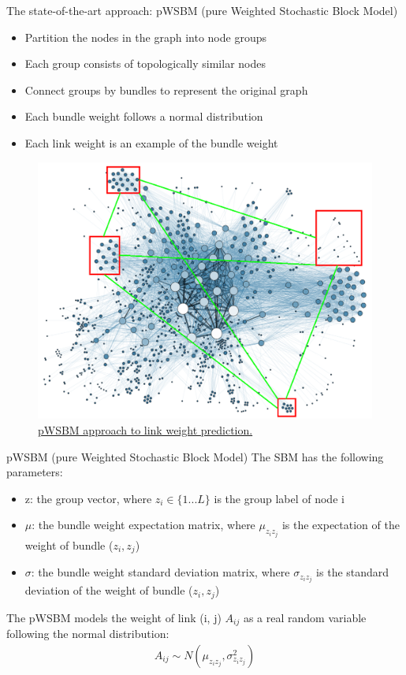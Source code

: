 \documentclass{beamer}
\begin{document}
\begin{frame}{The state-of-the-art approach: pWSBM (pure Weighted Stochastic Block Model)}
	\begin{itemize}
		\item Partition the nodes in the graph into node groups
		\item Each group consists of topologically similar nodes
		\item Connect groups by bundles to represent the original graph
		\item Each bundle weight follows a normal distribution
		\item Each link weight is an example of the bundle weight
	\end{itemize}
	\begin{figure}[H]
		\centering
		\includegraphics[width=0.4\linewidth]{SBM}
		\caption{ \href{https://commons.wikimedia.org/wiki/File:Social_Network_Analysis_Visualization.png}{pWSBM approach to link weight prediction.}}
		\label{fig:SBM}
	\end{figure}
\end{frame}

\begin{frame}{pWSBM (pure Weighted Stochastic Block Model)}
	The SBM has the following parameters:
	\begin{itemize}
		\item z: the group vector,
		where $ z_i \in \{ 1 ... L \} $ is the group label of node i
		\item $ \mu $: the bundle weight expectation matrix,
		where $ \mu_{z_i z_j} $ is the expectation of the weight of bundle ($z_i, z_j$)
		\item $ \sigma $: the bundle weight standard deviation matrix,
		where $ \sigma_{z_i z_j} $ is the standard deviation of the weight of bundle ($z_i, z_j$)
	\end{itemize}
	The pWSBM models the weight of link (i, j) $ A_{ij} $ as a real random variable following the normal distribution:
	\begin{align*}
		A_{ij} \sim N(\mu_{z_i z_j}, \sigma_{z_i z_j}^2)
	\end{align*}
\end{frame}
\end{document}
